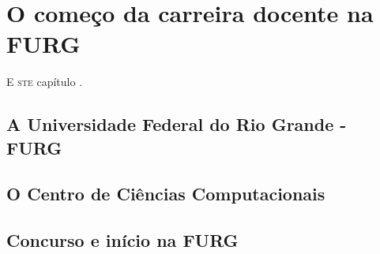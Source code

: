 \chapter{O começo da carreira docente na FURG}

\lettrine[lines=2, lhang=0.33, loversize=0.25, findent=1.5em]{E}{ ste} capítulo
\lipsum[40]. 


\section{A Universidade Federal do Rio Grande - FURG}

\lipsum[41]
\cite{fake1}
\cite{fake2}

\lipsum[42]

\lipsum[43]

\lipsum[44]

\lipsum[45]


\section{O Centro de Ciências Computacionais}
\lipsum[46]

\lipsum[47]

\lipsum[48]



\section{Concurso e início na FURG}

\lipsum[49]

\lipsum[50]

\lipsum[51]


